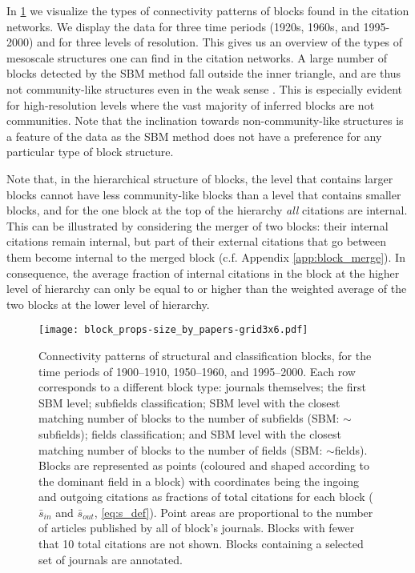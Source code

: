 \documentclass[a4paper,12pt]{article}
\begin{document}
In \cref{fig:block_props} we visualize the types of connectivity patterns of blocks found in the citation networks.
We display the data for three time periods (1920s, 1960s, and 1995-2000) and for three
levels of resolution. This gives us an overview of the types of mesoscale structures
one can find in the citation networks. A large number of blocks detected by the SBM method fall outside the inner triangle, and are thus not community-like structures even in the weak sense \citep{Radicchi2004Defining}. 
This is especially evident for high-resolution levels where the vast majority of inferred blocks are not communities.
Note that the inclination towards non-community-like structures is a feature of the data as the SBM method does not have a preference for any particular type of block structure.

Note that, in the hierarchical structure of blocks, the level that contains larger blocks cannot have less community-like blocks than a level that contains smaller blocks, and for the one block at the top of the hierarchy \emph{all} citations are internal.
This can be illustrated by considering the merger of two blocks: their internal citations remain internal, but part of their external citations that go between them become internal to the merged block (c.f. Appendix \ref{app:block_merge}).
In consequence, the average fraction of internal citations in the block at the higher level of hierarchy can only be equal to or higher than the weighted average of the two blocks at the lower level of hierarchy.



\begin{figure}
  \centering
  \vspace{-80pt}
  \texttt{[image: block\_props-size\_by\_papers-grid3x6.pdf]}
  \caption{\small Connectivity patterns of structural and classification blocks, for the time periods of 1900--1910,
1950--1960, and 1995--2000. 
Each row corresponds to a different block type:
journals themselves;
the first SBM level;
subfields classification;
SBM level with the closest matching number of blocks to the number of subfields (SBM: 
$\sim$subfields);
fields classification;
and SBM level with the closest matching number of blocks to the number of fields 
(SBM: $\sim$fields).
Blocks are represented as points (coloured and shaped according to the dominant field in 
a block) with coordinates being the ingoing and outgoing citations as fractions of
total citations for each block ($\bar{s}_{in}$ and $\bar{s}_{out}$, \cref{eq:s_def}).
Point areas are proportional to the number of articles published by all of block's 
journals.
Blocks with fewer that 10 total citations are not shown.
Blocks containing a selected set of journals are annotated.
}
  \label{fig:block_props}
\end{figure}
\end{document}
